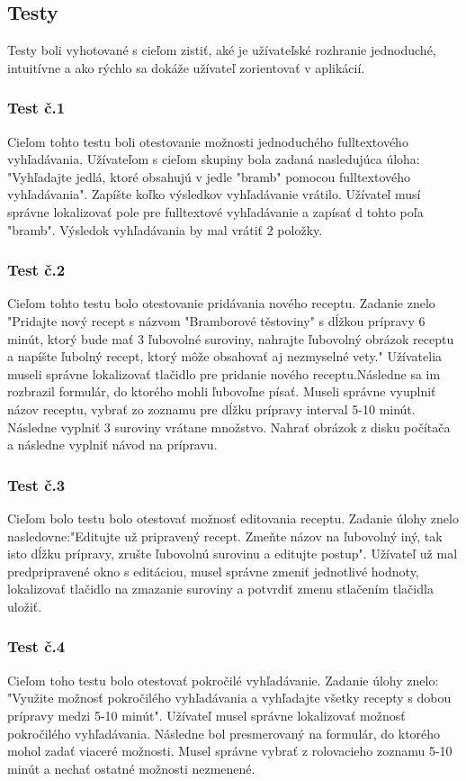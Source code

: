 \documentclass[12pt,a4paper,titlepage,final]{article}
\begin{document}
\subsection{Testy}
Testy boli vyhotované s cieľom zistiť, aké je užívateľské rozhranie jednoduché, intuitívne a ako rýchlo sa dokáže užívateľ zorientovať v aplikácií. 

\subsubsection{Test č.1}
Cieľom tohto testu boli otestovanie možnosti jednoduchého fulltextového vyhľadávania. Užívateľom s cieľom skupiny bola zadaná nasledujúca úloha: "Vyhľadajte jedlá, ktoré obsahujú v jedle "bramb" pomocou fulltextového vyhľadávania". Zapíšte koľko výsledkov vyhľadávanie vrátilo. Užívateľ musí správne lokalizovať pole pre fulltextové vyhľadávanie a zapísať d tohto poľa "bramb". Výsledok vyhľadávania by mal vrátiť 2 položky.

\subsubsection{Test č.2}
Cieľom tohto testu bolo otestovanie pridávania nového receptu. Zadanie znelo "Pridajte nový recept s názvom "Bramborové těstoviny" s dĺžkou prípravy 6 minút, ktorý bude mať 3 ľubovolné suroviny, nahrajte ľubovolný obrázok receptu a napíšte ľubolný recept, ktorý môže obsahovať aj nezmyselné vety." Užívatelia museli správne lokalizovať tlačidlo pre pridanie nového receptu.Následne sa im rozbrazil formulár, do ktorého mohli ľubovoľne písať. Museli správne vyuplniť názov receptu, vybrať zo zoznamu pre dĺžku prípravy interval 5-10 minút. Následne vyplniť 3 suroviny vrátane množstvo. Nahrať obrázok z disku počítača a následne vyplniť návod na prípravu.

\subsubsection{Test č.3}
Cieľom bolo testu bolo otestovať možnosť editovania receptu. Zadanie úlohy znelo nasledovne:"Editujte už pripravený recept. Zmeňte názov na ľubovolný iný, tak isto dĺžku prípravy, zrušte ľubovolnú surovinu a editujte postup". Užívateľ už mal predpripravené okno s editáciou, musel správne zmeniť jednotlivé hodnoty, lokalizovať tlačidlo na zmazanie suroviny a potvrdiť zmenu stlačením tlačidla uložiť.

\subsubsection{Test č.4}
Cieľom toho testu bolo otestovať pokročilé vyhľadávanie. Zadanie úlohy znelo: "Využite možnosť pokročilého vyhľadávania a vyhľadajte všetky recepty s dobou prípravy medzi 5-10 minút". Užívateľ musel správne lokalizovať možnosť pokročilého vyhľadávania. Následne bol presmerovaný na formulár, do ktorého mohol zadať viaceré možnosti. Musel správne vybrať z rolovacieho zoznamu 5-10 minút a nechať ostatné možnosti nezmenené.
\end{document}
